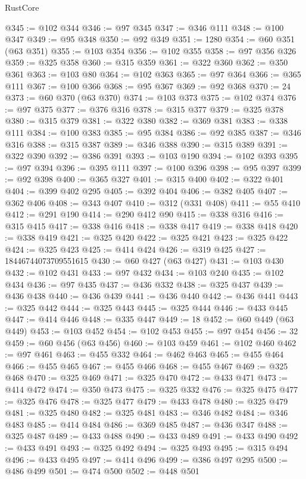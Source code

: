 \begin{lexlean}{RustCore}
\begin{coremodule}
@345 := @102 @344
@346 := @97 @345
@347 := @346 @111
@348 := @100 @347
@349 := @95 @348
@350 := @92 @349
@351 := 1280
@354 := @60 @351 (@63 @351)
@355 := @103 @354
@356 := @102 @355
@358 := @97 @356 @326
@359 := @325 @358
@360 := @315 @359
@361 := @322 @360
@362 := @350 @361
@363 := @103 @80
@364 := @102 @363
@365 := @97 @364
@366 := @365 @111
@367 := @100 @366
@368 := @95 @367
@369 := @92 @368
@370 := 24
@373 := @60 @370 (@63 @370)
@374 := @103 @373
@375 := @102 @374
@376 := @97 @375
@377 := @376 @316
@378 := @315 @377
@379 := @325 @378
@380 := @315 @379
@381 := @322 @380
@382 := @369 @381
@383 := @338 @111
@384 := @100 @383
@385 := @95 @384
@386 := @92 @385
@387 := @346 @316
@388 := @315 @387
@389 := @346 @388
@390 := @315 @389
@391 := @322 @390
@392 := @386 @391
@393 := @103 @190
@394 := @102 @393
@395 := @97 @394
@396 := @395 @111
@397 := @100 @396
@398 := @95 @397
@399 := @92 @398
@400 := @365 @327
@401 := @315 @400
@402 := @322 @401
@404 := @399 @402 @295
@405 := @392 @404
@406 := @382 @405
@407 := @362 @406
@408 := @343 @407
@410 := @312 (@331 @408)
@411 := @55 @410
@412 := @291 @190
@414 := @290 @412 @90
@415 := @338 @316
@416 := @315 @415
@417 := @338 @416
@418 := @338 @417
@419 := @338 @418
@420 := @338 @419
@421 := @325 @420
@422 := @325 @421
@423 := @325 @422
@424 := @325 @423
@425 := @414 @424
@426 := @319 @425
@427 := 18446744073709551615
@430 := @60 @427 (@63 @427)
@431 := @103 @430
@432 := @102 @431
@433 := @97 @432
@434 := @103 @240
@435 := @102 @434
@436 := @97 @435
@437 := @436 @332
@438 := @325 @437
@439 := @436 @438
@440 := @436 @439
@441 := @436 @440
@442 := @436 @441
@443 := @325 @442
@444 := @325 @443
@445 := @325 @444
@446 := @433 @445
@447 := @414 @446
@448 := @335 @447
@449 := 18
@452 := @60 @449 (@63 @449)
@453 := @103 @452
@454 := @102 @453
@455 := @97 @454
@456 := 32
@459 := @60 @456 (@63 @456)
@460 := @103 @459
@461 := @102 @460
@462 := @97 @461
@463 := @455 @332
@464 := @462 @463
@465 := @455 @464
@466 := @455 @465
@467 := @455 @466
@468 := @455 @467
@469 := @325 @468
@470 := @325 @469
@471 := @325 @470
@472 := @433 @471
@473 := @414 @472
@474 := @350 @473
@475 := @325 @332
@476 := @325 @475
@477 := @325 @476
@478 := @325 @477
@479 := @433 @478
@480 := @325 @479
@481 := @325 @480
@482 := @325 @481
@483 := @346 @482
@484 := @346 @483
@485 := @414 @484
@486 := @369 @485
@487 := @436 @347
@488 := @325 @487
@489 := @433 @488
@490 := @433 @489
@491 := @433 @490
@492 := @433 @491
@493 := @325 @492
@494 := @325 @493
@495 := @315 @494
@496 := @433 @495
@497 := @414 @496
@499 := @386 @497 @295
@500 := @486 @499
@501 := @474 @500
@502 := @448 @501

\end{coremodule}
\end{lexlean}
